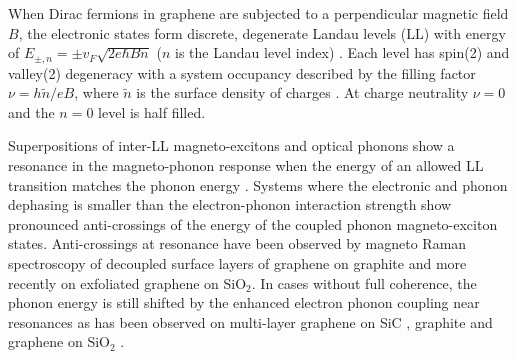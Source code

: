 \documentclass[prl,aps,superscriptaddress,showpacs,reprint]{revtex4-1}
\begin{document}
When Dirac fermions in graphene are subjected to a perpendicular magnetic field $B$, the electronic states form discrete, degenerate Landau levels (LL) with energy of $E_{\pm, n}=\pm v_F\sqrt{2e\hbar Bn}$ ($n$ is the Landau level index) \cite{neto2009electronic,goerbig2011electronic}. Each level has spin(2) and valley(2) degeneracy with a system occupancy described by the filling factor $\nu = h\widetilde{n}/eB$, where $\widetilde{n}$ is the surface density of charges \cite{goerbig2007filling}.
At charge neutrality $\nu = 0$ and the $n=0$ level is half filled. 

Superpositions of inter-LL magneto-excitons and optical phonons show a resonance in the magneto-phonon response when the energy of an allowed LL transition matches the phonon energy \cite{ando2007magnetic,goerbig2007filling,goerbig2011electronic}. 
Systems where the electronic and phonon dephasing is smaller than the electron-phonon interaction strength show pronounced anti-crossings of the energy of the coupled phonon magneto-exciton states. Anti-crossings at resonance have been observed by magneto Raman spectroscopy of decoupled surface layers of graphene on graphite \cite{kuhne2012polarization,faugeras2011magneto,yan2010observation} and more recently on exfoliated graphene on SiO$_2$\cite{PhysRevLett.110.227402}. In cases without full coherence, the phonon energy is still shifted  by the enhanced electron phonon coupling near resonances as has been observed on multi-layer graphene on SiC \cite{faugeras2009tuning}, graphite \cite{PhysRevB.84.235138,kim2012magnetophonon} and graphene on SiO$_2$ \cite{kossacki2012circular}.
\end{document}
